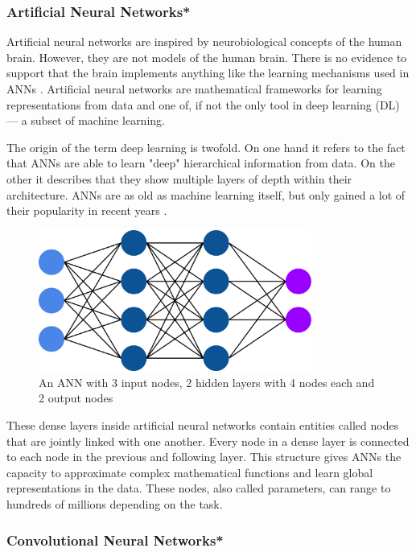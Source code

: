 \subsubsection{Artificial Neural Networks*}

Artificial neural networks are inspired by neurobiological concepts of the human brain. However, they are not models of the human brain. There is no evidence to support that the brain implements anything like the learning mechanisms used in ANNs \cite{Chollet2017}. Artificial neural networks are mathematical frameworks for learning representations from data and one of, if not the only tool in deep learning (DL) --- a subset of machine learning.

The origin of the term deep learning is twofold. On one hand it refers to the fact that ANNs are able to learn "deep" hierarchical information from data. On the other it describes that they show multiple layers of depth within their architecture. ANNs are as old as machine learning itself, but only gained a lot of their popularity in recent years \cite{Chollet2017}.

\begin{figure}[H]
\centering
\par
\includegraphics[width=0.8\textwidth]{imgs/ann.png}
\caption{An ANN with 3 input nodes, 2 hidden layers with 4 nodes each and 2 output nodes}
\par
\end{figure}

These dense layers inside artificial neural networks contain entities called nodes that are jointly linked with one another. Every node in a dense layer is connected to each node in the previous and following layer. This structure gives ANNs the capacity to approximate complex mathematical functions and learn global representations in the data. These nodes, also called parameters, can range to hundreds of millions depending on the task.

\subsubsection{Convolutional Neural Networks*}

